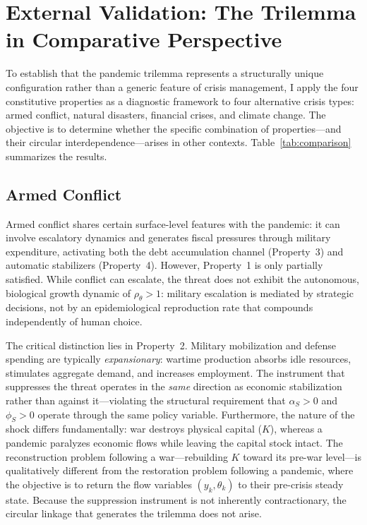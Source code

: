 \documentclass[12pt, a4paper]{article}
\begin{document}
\section{External Validation: The Trilemma in Comparative Perspective}
\label{app:comparison}

To establish that the pandemic trilemma represents a structurally unique configuration rather than a generic feature of crisis management, I apply the four constitutive properties as a diagnostic framework to four alternative crisis types: armed conflict, natural disasters, financial crises, and climate change. The objective is to determine whether the specific combination of properties---and their circular interdependence---arises in other contexts. Table~\ref{tab:comparison} summarizes the results.

\subsection*{Armed Conflict}

Armed conflict shares certain surface-level features with the pandemic: it can involve escalatory dynamics and generates fiscal pressures through military expenditure, activating both the debt accumulation channel (Property~3) and automatic stabilizers (Property~4). However, Property~1 is only partially satisfied. While conflict can escalate, the threat does not exhibit the autonomous, biological growth dynamic of $\rho_\theta > 1$: military escalation is mediated by strategic decisions, not by an epidemiological reproduction rate that compounds independently of human choice.

The critical distinction lies in Property~2. Military mobilization and defense spending are typically \textit{expansionary}: wartime production absorbs idle resources, stimulates aggregate demand, and increases employment. The instrument that suppresses the threat operates in the \textit{same} direction as economic stabilization rather than against it---violating the structural requirement that $\alpha_S > 0$ and $\phi_S > 0$ operate through the same policy variable. Furthermore, the nature of the shock differs fundamentally: war destroys physical capital ($K$), whereas a pandemic paralyzes economic flows while leaving the capital stock intact. The reconstruction problem following a war---rebuilding $K$ toward its pre-war level---is qualitatively different from the restoration problem following a pandemic, where the objective is to return the flow variables $(y_k, \theta_k)$ to their pre-crisis steady state. Because the suppression instrument is not inherently contractionary, the circular linkage that generates the trilemma does not arise.
\end{document}

